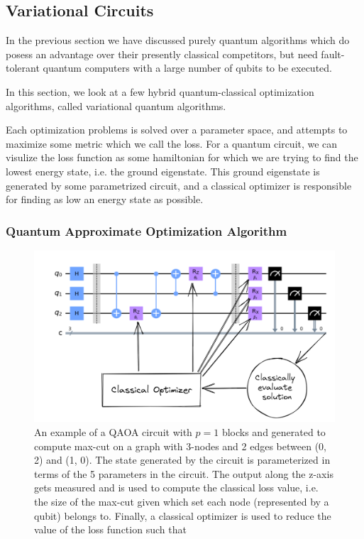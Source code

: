 \subsection{Variational Circuits}
\label{sec:variational-circuits}

In the previous section we have discussed purely quantum algorithms which do posess an advantage over their presently classical competitors, but need fault-tolerant quantum computers with a large number of qubits to be executed.

In this section, we look at a few hybrid quantum-classical optimization algorithms, called variational quantum algorithms. 

Each optimization problems is solved over a parameter space, and attempts to maximize some metric which we call the loss. For a quantum circuit, we can visulize the loss function as some hamiltonian for which we are trying to find the lowest energy state, i.e. the ground eigenstate. This ground eigenstate is generated by some parametrized circuit, and a classical optimizer is responsible for finding as low an energy state as possible.

\subsubsection{Quantum Approximate Optimization Algorithm}
\label{sec:variational-circuits-qaoa}

\begin{figure}[ht]
    \centering
    \includegraphics[width=0.7\linewidth]{figures/intro/qaoa-optimization.png}
    \caption[Variational Circuit for QAOA]{An example of a QAOA circuit with $p = 1$ blocks and generated to compute max-cut on a graph with 3-nodes and 2 edges between (0, 2) and (1, 0). The state generated by the circuit is parameterized in terms of the 5 parameters in the circuit. The output along the z-axis gets measured and is used to compute the classical loss value, i.e. the size of the max-cut given which set each node (represented by a qubit) belongs to. Finally, a classical optimizer is used to reduce the value of the loss function such that }
\end{figure}

